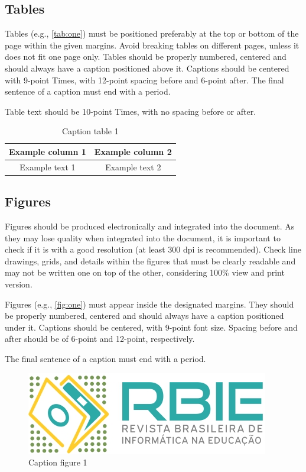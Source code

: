 \documentclass[english, spanish, brazilian]{RBIEarticle} %
\begin{document}
\subsection{Tables}
Tables (e.g., \autoref{tab:one}) must be positioned preferably at the top or bottom of the page within the given margins. Avoid breaking tables on different pages, unless it does not fit one page only. Tables should be properly numbered, centered and should always have a caption positioned above it. Captions should be centered with 9-point Times, with 12-point spacing before and 6-point after. The final sentence of a caption must end with a period.

Table text should be 10-point Times, with no spacing before or after.

\begin{table}[h]
	\caption{Caption table 1}
	\label{tab:one}
	\centering\footnotesize%
	\begin{tabular}{|c|c|}
		\hline
		\rowcolor{gray} \textbf{Example column 1} & \textbf{Example column 2}\\
		\hline
		Example text 1 & Example text 2\\
		\hline
	\end{tabular}
\end{table}


\subsection{Figures}
Figures should be produced electronically and integrated into the document. As they may lose quality when integrated into the document, it is important to check if it is with a good resolution (at least 300 dpi is recommended). Check line drawings, grids, and details within the figures that must be clearly readable and may not be written one on top of the other, considering 100\% view and print version.

Figures (e.g., \autoref{fig:one}) must appear inside the designated margins. They should be properly numbered, centered and should always have a caption positioned under it. Captions should be centered, with 9-point font size. Spacing before and after should be of 6-point and 12-point, respectively.

The final sentence of a caption must end with a period. 

\begin{figure}[h]
	\centerline{\includegraphics[scale=0.25]{newlogo.png}}
	\caption{Caption figure 1}
	\label{fig:one}
\end{figure}
\end{document}
